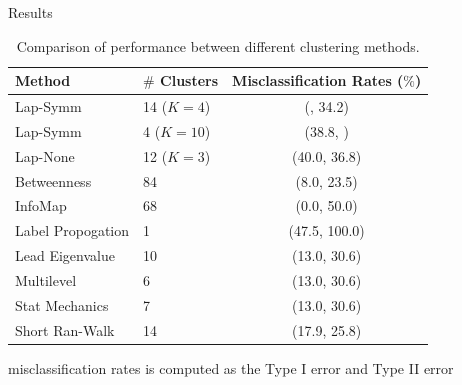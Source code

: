 \documentclass[final]{beamer}
\newlength{\colthreewid}
\newcommand{\bi}{\begin{itemize}}
\begin{document}
\begin{frame}[t]
\begin{columns}[t]
\begin{column}{\colthreewid}
\begin{block}{Results}
    
    
     \begin{table}[ht]
  \centering
  \caption{Comparison of performance between different clustering methods.}
  \begin{tabular}{llc}
    \toprule
    Method & $\#$ Clusters & Misclassification Rates ($\%$) \\ 
    \midrule
    Lap-Symm & 14 ($K=4$) & ({\color{blue}{14.3}}, 34.2) \\ 
    Lap-Symm & 4 ($K=10$) & (38.8, {\color{blue}{10.0}}) \\ 
    Lap-None & 12 ($K=3$) & (40.0, 36.8) \\ 
    Betweenness & 84 & (8.0, 23.5) \\ 
    InfoMap & 68 & (0.0, 50.0) \\ 
    Label Propogation & 1 & (47.5, 100.0) \\ 
    Lead Eigenvalue & 10 & (13.0, 30.6)\\
    Multilevel & 6 & (13.0, 30.6)\\
    Stat Mechanics & 7 & (13.0, 30.6)\\
    Short Ran-Walk & 14 & (17.9, 25.8)\\
   \bottomrule
\end{tabular}
\end{table}
\centering
{\small misclassification rates is computed as the Type I error and Type II error}\\
      \end{block}

\end{column}
\end{columns}
\end{frame}
\end{document}
